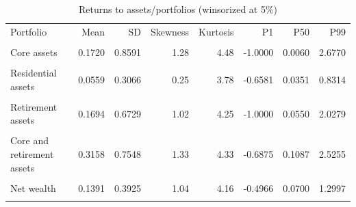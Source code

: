 \begin{table}[htbp]\centering\small
\caption{Returns to assets/portfolios (winsorized at 5\%)}
\label{tab:returns_portfolio_moments_pooled_w5}
\begin{tabular}{lrrrrrrr}\toprule
Portfolio & Mean & SD & Skewness & Kurtosis & P1 & P50 & P99 \\\\ \midrule
Core assets & 0.1720 & 0.8591 & 1.28 & 4.48 & -1.0000 & 0.0060 & 2.6770 \\\\
Residential assets & 0.0559 & 0.3066 & 0.25 & 3.78 & -0.6581 & 0.0351 & 0.8314 \\\\
Retirement assets & 0.1694 & 0.6729 & 1.02 & 4.25 & -1.0000 & 0.0550 & 2.0279 \\\\
\addlinespace
Core and retirement assets & 0.3158 & 0.7548 & 1.33 & 4.33 & -0.6875 & 0.1087 & 2.5255 \\\\
Net wealth & 0.1391 & 0.3925 & 1.04 & 4.16 & -0.4966 & 0.0700 & 1.2997 \\\\
\bottomrule
\end{tabular}
\end{table}
